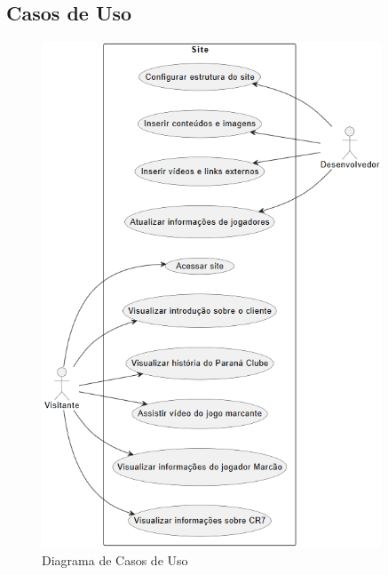 \documentclass[12pt,a4paper]{article}
\begin{document}
\subsection{Casos de Uso}
\begin{figure}[H]
    \centering
    \includegraphics[width=0.9\textwidth]{casouso.png}
    \caption{Diagrama de Casos de Uso}
\end{figure}
\end{document}

